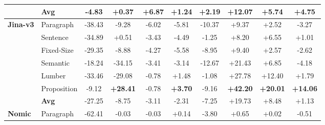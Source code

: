 \begin{table}[htbp]
\begin{tabular}{llcccccccc}
		& \textbf{Avg} & \cellcolor{lightred}-4.83 & \cellcolor{lightgreen}+0.37 & \cellcolor{lightgreen}+6.87 & \cellcolor{lightgreen}+1.24 & \cellcolor{lightgreen}+2.19 & \cellcolor{lightgreen}+12.07 & \cellcolor{lightgreen}+5.74 & \cellcolor{lightgreen}+4.75 \\
		\midrule
		\multirow{6}{*}{\textbf{Jina-v3}} & Paragraph & \cellcolor{lightred}-38.43 & \cellcolor{lightred}-9.28 & \cellcolor{lightred}-6.02 & \cellcolor{lightred}-5.81 & \cellcolor{lightred}-10.37 & \cellcolor{lightgreen}+9.37 & \cellcolor{lightgreen}+2.52 & \cellcolor{lightred}-3.27 \\
		& Sentence & \cellcolor{lightred}-34.89 & \cellcolor{lightgreen}+0.51 & \cellcolor{lightred}-3.43 & \cellcolor{lightred}-4.49 & \cellcolor{lightred}-1.25 & \cellcolor{lightgreen}+8.20 & \cellcolor{lightgreen}+6.55 & \cellcolor{lightgreen}+1.01 \\
		& Fixed-Size & \cellcolor{lightred}-29.35 & \cellcolor{lightred}-8.88 & \cellcolor{lightred}-4.27 & \cellcolor{lightred}-5.58 & \cellcolor{lightred}-8.95 & \cellcolor{lightgreen}+9.40 & \cellcolor{lightgreen}+2.57 & \cellcolor{lightred}-2.62 \\
		& Semantic & \cellcolor{lightred}-18.24 & \cellcolor{lightred}-34.15 & \cellcolor{lightred}-3.41 & \cellcolor{lightred}-3.14 & \cellcolor{lightred}-12.67 & \cellcolor{lightgreen}+21.43 & \cellcolor{lightgreen}+6.85 & \cellcolor{lightred}-4.18 \\
		& Lumber & \cellcolor{lightred}-33.46 & \cellcolor{lightred}-29.08 & \cellcolor{lightred}-0.78 & \cellcolor{lightgreen}+1.48 & \cellcolor{lightred}-1.08 & \cellcolor{lightgreen}+27.78 & \cellcolor{lightgreen}+12.40 & \cellcolor{lightgreen}+1.79 \\
		& Proposition & \cellcolor{lightred}-9.12 & \cellcolor{lightgreen}\textbf{+28.41} & \cellcolor{lightred}-0.78 & \cellcolor{lightgreen}\textbf{+3.70} & \cellcolor{lightred}-9.16 & \cellcolor{lightgreen}\textbf{+42.20} & \cellcolor{lightgreen}\textbf{+20.01} & \cellcolor{lightgreen}\textbf{+14.06} \\
		& \textbf{Avg} & \cellcolor{lightred}-27.25 & \cellcolor{lightred}-8.75 & \cellcolor{lightred}-3.11 & \cellcolor{lightred}-2.31 & \cellcolor{lightred}-7.25 & \cellcolor{lightgreen}+19.73 & \cellcolor{lightgreen}+8.48 & \cellcolor{lightgreen}+1.13 \\
		\midrule
		\multirow{6}{*}{\textbf{Nomic}} & Paragraph & \cellcolor{lightred}-62.41 & \cellcolor{lightred}-0.03 & \cellcolor{lightred}-0.03 & \cellcolor{lightgreen}+0.14 & \cellcolor{lightred}-3.80 & \cellcolor{lightgreen}+0.65 & \cellcolor{lightgreen}+0.02 & \cellcolor{lightred}-0.51 \\

\end{tabular}
\end{table}
